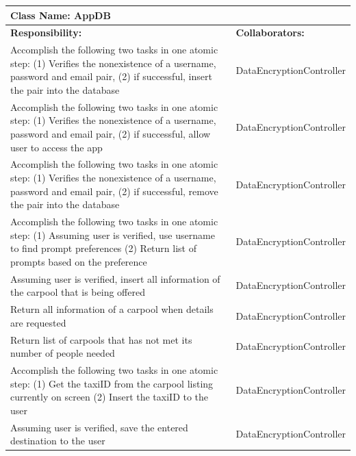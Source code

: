 \documentclass[]{article}
\begin{document}
	\begin{table}[H]
	\centering
	\begin{tabular}{|p{6cm}|p{6cm}|}
	\hline 
		\multicolumn{2}{|l|}{\textbf{Class Name: AppDB}} \\
	\hline
	\textbf{Responsibility:} & \textbf{Collaborators:} \\
	\hline
	Accomplish the following two tasks in one atomic step: (1) Verifies the nonexistence of a username, password and email pair, (2) if successful, insert the pair into the database & DataEncryptionController \\ \hline
	Accomplish the following two tasks in one atomic step: (1) Verifies the nonexistence of a username, password and email pair, (2) if successful, allow user to access the app & DataEncryptionController\\ \hline
	Accomplish the following two tasks in one atomic step: (1) Verifies the nonexistence of a username, password and email pair, (2) if successful, remove the pair into the database & DataEncryptionController\\ \hline
	Accomplish the following two tasks in one atomic step: (1) Assuming user is verified, use username to find prompt preferences (2) Return list of prompts based on the preference & DataEncryptionController\\ \hline
	Assuming user is verified, insert all information of the carpool that is being offered & DataEncryptionController\\ \hline
	Return all information of a carpool when details are requested & DataEncryptionController\\ \hline
	Return list of carpools that has not met its number of people needed & DataEncryptionController\\ \hline
	Accomplish the following two tasks in one atomic step: (1) Get the taxiID from the carpool listing currently on screen (2) Insert the taxiID to the user & DataEncryptionController\\ \hline
	Assuming user is verified, save the entered destination to the user & DataEncryptionController\\ \hline
	\end{tabular}
	\end{table}%
\end{document}
